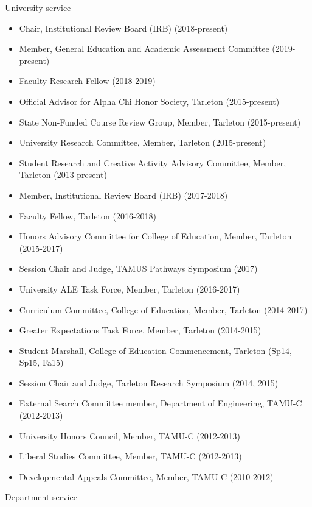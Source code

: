 \documentclass[article,10pt]{article}
\begin{document}
University service

\begin{itemize}
\item Chair, Institutional Review Board (IRB) (2018-present)
\item Member, General Education and Academic Assessment Committee (2019-present)
\item Faculty Research Fellow (2018-2019)
\item Official Advisor for Alpha Chi Honor Society, Tarleton (2015-present)
\item State Non-Funded Course Review Group, Member, Tarleton (2015-present)
\item University Research Committee, Member, Tarleton (2015-present)
\item Student Research and Creative Activity Advisory Committee, Member, Tarleton (2013-present)
\item Member, Institutional Review Board (IRB) (2017-2018)
\item Faculty Fellow, Tarleton (2016-2018)
\item Honors Advisory Committee for College of Education, Member, Tarleton (2015-2017)
\item Session Chair and Judge, TAMUS Pathways Symposium (2017)
\item University ALE Task Force, Member, Tarleton (2016-2017)
\item Curriculum Committee, College of Education, Member, Tarleton (2014-2017)
\item Greater Expectations Task Force, Member, Tarleton (2014-2015)
\item Student Marshall, College of Education Commencement, Tarleton (Sp14, Sp15, Fa15)
\item Session Chair and Judge, Tarleton Research Symposium (2014, 2015)
\item External Search Committee member, Department of Engineering, TAMU-C (2012-2013)
\item University Honors Council, Member, TAMU-C (2012-2013)
\item Liberal Studies Committee, Member, TAMU-C (2012-2013)
\item Developmental Appeals Committee, Member, TAMU-C (2010-2012)
\end{itemize}

Department service
\end{document}
